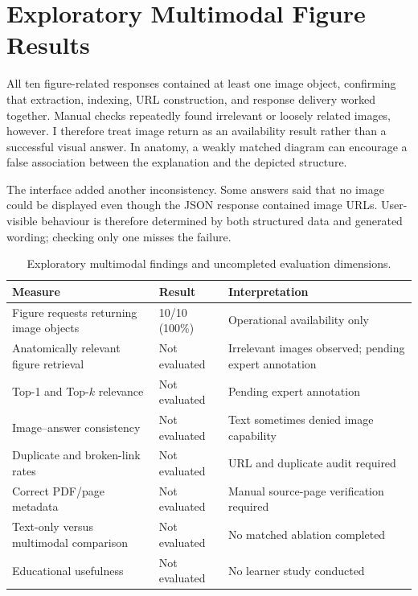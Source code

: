 \section{Exploratory Multimodal Figure Results}
\label{sec:multimodal-results}

All ten figure-related responses contained at least one image object, confirming that extraction, indexing, URL construction, and response delivery worked together. Manual checks repeatedly found irrelevant or loosely related images, however. I therefore treat image return as an availability result rather than a successful visual answer. In anatomy, a weakly matched diagram can encourage a false association between the explanation and the depicted structure.

The interface added another inconsistency. Some answers said that no image could be displayed even though the JSON response contained image URLs. User-visible behaviour is therefore determined by both structured data and generated wording; checking only one misses the failure.

\begin{table}[htbp]
  \centering
  \caption{Exploratory multimodal findings and uncompleted evaluation dimensions.}
  \label{tab:multimodal-results}
  \small
  \begin{tabularx}{\textwidth}{L{0.36\textwidth}L{0.22\textwidth}Y}
    \toprule
    Measure & Result & Interpretation \\
    \midrule
    Figure requests returning image objects & 10/10 (100\%) & Operational availability only \\
    Anatomically relevant figure retrieval & Not evaluated & Irrelevant images observed; pending expert annotation \\
    Top-1 and Top-$k$ relevance & Not evaluated & Pending expert annotation \\
    Image--answer consistency & Not evaluated & Text sometimes denied image capability \\
    Duplicate and broken-link rates & Not evaluated & URL and duplicate audit required \\
    Correct PDF/page metadata & Not evaluated & Manual source-page verification required \\
    Text-only versus multimodal comparison & Not evaluated & No matched ablation completed \\
    Educational usefulness & Not evaluated & No learner study conducted \\
    \bottomrule
  \end{tabularx}
\end{table}

